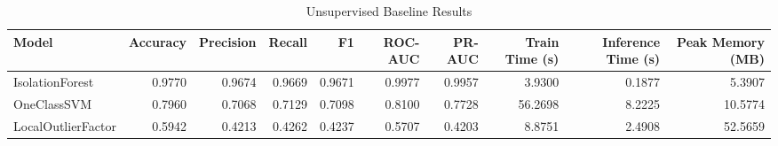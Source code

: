 \begin{table}
\caption{Unsupervised Baseline Results}
\label{tab:unsupervised_baseline_results}
\begin{tabular}{lrrrrrrrrr}
\toprule
Model & Accuracy & Precision & Recall & F1 & ROC-AUC & PR-AUC & Train Time (s) & Inference Time (s) & Peak Memory (MB) \\
\midrule
IsolationForest & 0.9770 & 0.9674 & 0.9669 & 0.9671 & 0.9977 & 0.9957 & 3.9300 & 0.1877 & 5.3907 \\
OneClassSVM & 0.7960 & 0.7068 & 0.7129 & 0.7098 & 0.8100 & 0.7728 & 56.2698 & 8.2225 & 10.5774 \\
LocalOutlierFactor & 0.5942 & 0.4213 & 0.4262 & 0.4237 & 0.5707 & 0.4203 & 8.8751 & 2.4908 & 52.5659 \\
\bottomrule
\end{tabular}
\end{table}
